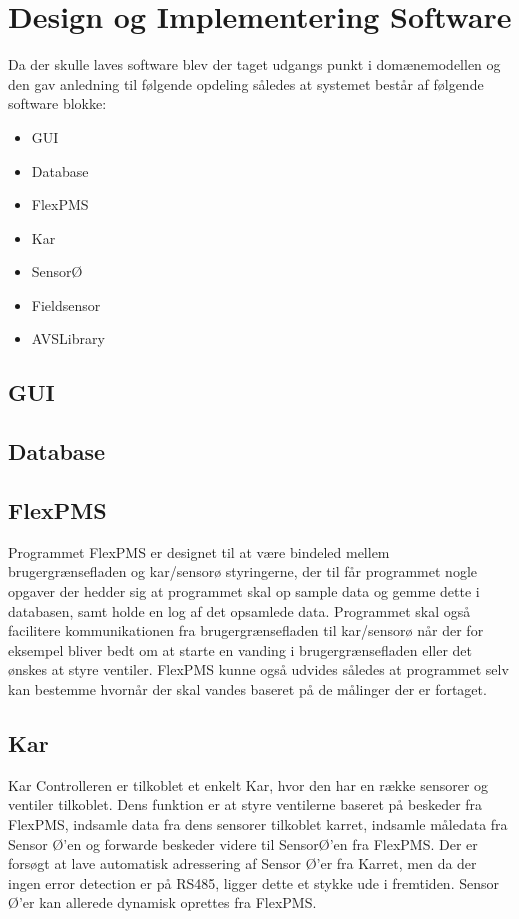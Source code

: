 \section{Design og Implementering Software}
Da der skulle laves software blev der taget udgangs punkt i domænemodellen og den gav anledning til følgende opdeling således at
systemet består af følgende software blokke:
\begin{itemize}
\item GUI
\item Database
\item FlexPMS
\item Kar
\item SensorØ
\item Fieldsensor
\item AVSLibrary
\end{itemize}

\subsection{GUI}

\subsection{Database}

\subsection{FlexPMS}
Programmet FlexPMS er designet til at være bindeled mellem brugergrænsefladen og kar/sensorø
styringerne, der til får programmet nogle opgaver der hedder sig at programmet skal op sample
data og gemme dette i databasen, samt holde en log af det opsamlede data. Programmet skal også
facilitere kommunikationen fra brugergrænsefladen til kar/sensorø når der for eksempel bliver bedt
om at starte en vanding i brugergrænsefladen eller det ønskes at styre ventiler. FlexPMS kunne
også udvides således at programmet selv kan bestemme hvornår der skal vandes baseret på de
målinger der er fortaget.

\subsection{Kar}
Kar Controlleren er tilkoblet et enkelt Kar, hvor den har en række sensorer og ventiler tilkoblet. Dens funktion er at styre ventilerne baseret på beskeder fra FlexPMS, indsamle data fra dens sensorer tilkoblet karret, indsamle måledata fra Sensor Ø'en og forwarde beskeder videre til SensorØ'en fra FlexPMS. Der er forsøgt at lave automatisk adressering af Sensor Ø'er fra Karret, men da der ingen error detection er på RS485, ligger dette et stykke ude i fremtiden. Sensor Ø'er kan allerede dynamisk oprettes fra FlexPMS.

